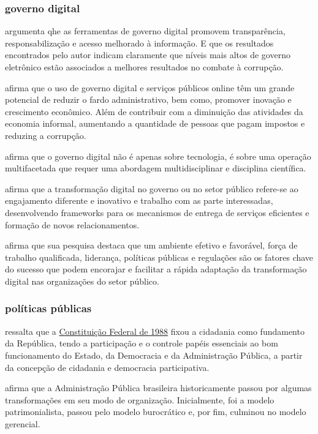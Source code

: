 \subsubsection{governo digital}

\cite{martins2018war} argumenta qhe as ferramentas de governo digital promovem transparência, responsabilização e acesso melhorado à informação. E que os resultados encontrados pelo autor indicam claramente que níveis mais altos de governo eletrônico estão associados a melhores resultados no combate à corrupção.

\cite{veiga2016digital} afirma que o uso de governo digital e serviços públicos online têm um grande potencial de reduzir o fardo administrativo, bem como, promover inovação e crescimento econômico. Além de contribuir com a diminuição das atividades da economia informal, aumentando a quantidade de pessoas que pagam impostos e reduzing a corrupção.

\cite{veiga2016digital} afirma que o governo digital não é apenas sobre tecnologia, é sobre uma operação multifacetada  que requer uma abordagem multidisciplinar e disciplina científica.

\cite{alenezi2022understanding} afirma que a transformação digital no governo ou no setor público refere-se ao engajamento diferente e inovativo e trabalho com as parte interessadas, desenvolvendo frameworks para os mecanismos de entrega de serviços eficientes e formação de novos relacionamentos.

\cite{alenezi2022understanding} afirma que sua pesquisa destaca que um ambiente efetivo e favorável, força de trabalho qualificada, liderança, políticas públicas e regulações são os fatores chave do sucesso que podem encorajar e facilitar a rápida adaptação da transformação digital nas organizações do setor público.

\subsubsection{políticas públicas}

\cite{tavares2022governo} ressalta que a \href{https://www.planalto.gov.br/ccivil_03/constituicao/constituicao.htm}{Constituição Federal de 1988} fixou a cidadania como fundamento da República, tendo a participação e o controle papéis essenciais ao bom funcionamento do Estado, da Democracia e da Administração Pública, a partir da concepção de cidadania e democracia participativa.

\cite{tavares2022governo} afirma que a Administração Pública brasileira historicamente passou por algumas transformações em seu modo de organização. Inicialmente, foi a modelo patrimonialista, passou pelo modelo burocrático e, por fim, culminou no modelo gerencial.

